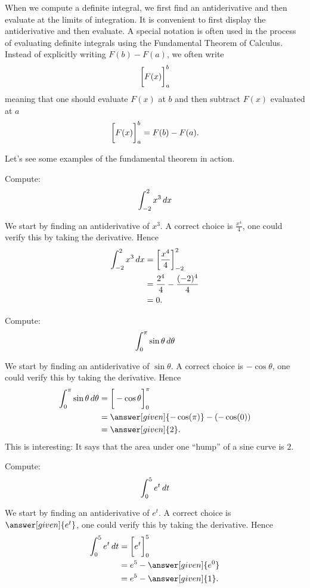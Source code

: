 \documentclass{ximera}
\begin{document}
When we compute a definite integral, we first find an antiderivative
and then evaluate at the limits of integration. It is convenient to
first display the antiderivative and then evaluate.  A special
notation is often used in the process of evaluating definite integrals
using the Fundamental Theorem of Calculus. Instead of explicitly
writing $F(b)-F(a)$, we often write
\[
\bigg[ F(x) \bigg]_a^b
\]
meaning that one should evaluate $F(x)$ at $b$ and then subtract
$F(x)$ evaluated at $a$
\[
\bigg[ F(x) \bigg]_a^b = F(b)-F(a).
\]

Let's see some examples of the fundamental theorem in action.

\begin{example}
  Compute:
  \[
  \int_{-2}^2 x^3\,d x
  \]
  \begin{explanation}
    We start by finding an antiderivative of $x^3$.  A correct choice
    is $\frac{x^{4}}{4}$, one could verify this by taking the
    derivative. Hence
    \begin{align*}
      \int_{-2}^2 x^3 \,d x &=\bigg[ \frac{x^4}{4} \bigg]_{-2}^2\\
      &= \frac{2^4}{4} - \frac{(-2)^4}{4}\\
      &= 0.
    \end{align*}
  \end{explanation}
\end{example}


\begin{example}
  Compute:
  \[
  \int_0^\pi \sin \theta \,d \theta
  \]
  \begin{explanation}
    We start by finding an antiderivative of $\sin \theta$.  A correct
    choice is $-\cos\theta$, one could verify this by taking the
    derivative. Hence
    \begin{align*}
      \int_0^\pi \sin\theta \d \theta &= \eval{-\cos\theta}_0^\pi\\
      &=\answer[given]{-\cos(\pi)} - (-\cos(0))\\
      &=\answer[given]{2}.
    \end{align*}
    This is interesting: It says that the area under one ``hump'' of a
    sine curve is $2$.
  \end{explanation}
\end{example}

\begin{example}
  Compute:
  \[
  \int_0^5 e^t\,d t
  \]
  \begin{explanation}
    We start by finding an antiderivative of $e^t$.  A correct choice
    is $\answer[given]{e^t}$, one could verify this by taking the
    derivative. Hence
    \begin{align*}
      \int_0^5 e^t \d t &= \eval{e^t}_0^5 \\
      &= e^5-\answer[given]{e^0}\\
      &= e^5-\answer[given]{1}.
    \end{align*}
  \end{explanation}
\end{example}
\end{document}
